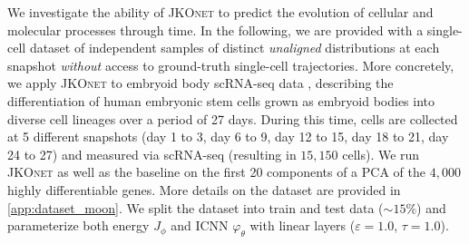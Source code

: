 We investigate the ability of \textsc{JKOnet} to predict the evolution of cellular and molecular processes through time.
In the following, we are provided with a single-cell dataset of independent samples of distinct \emph{unaligned} distributions at each snapshot \textit{without} access to ground-truth single-cell trajectories. 
More concretely, we apply \textsc{JKOnet} to embryoid body sc\acrshort{RNA-seq} data \citep{moon2019visualizing}, describing the differentiation of human embryonic stem cells grown as embryoid bodies into diverse cell lineages over a period of 27 days. During this time, cells are collected at 5 different snapshots (day 1 to 3, day 6 to 9, day 12 to 15, day 18 to 21, day 24 to 27) and measured via scRNA-seq (resulting in $15,150$ cells).
We run \textsc{JKOnet} as well as the baseline on the first 20 components of a \acrfull{PCA} of the $4,000$ highly differentiable genes. More details on the dataset are provided in \cref{app:dataset_moon}.
We split the dataset into train and test data ($\sim 15 \%$) and parameterize both energy $J_\phi$ and \acrshort{ICNN} $\varphi_\theta$ with linear layers ($\varepsilon = 1.0$, $\tau = 1.0$).


